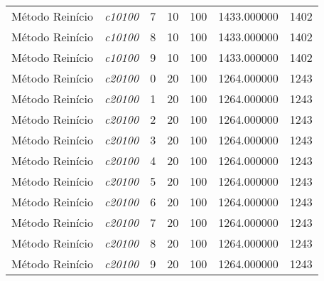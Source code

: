 {\begin{longtable}{cc|c|cc|cc}
			Método Reinício    & \textit{c10100}    & 7                               & 10               & 100              & 1433.000000                          & 1402 \\ 
			Método Reinício    & \textit{c10100}    & 8                               & 10               & 100              & 1433.000000                          & 1402 \\ 
			Método Reinício    & \textit{c10100}    & 9                               & 10               & 100              & 1433.000000                          & 1402 \\ \hline
			Método Reinício    & \textit{c20100}    & 0                               & 20               & 100              & 1264.000000                          & 1243 \\ 
			Método Reinício    & \textit{c20100}    & 1                               & 20               & 100              & 1264.000000                          & 1243 \\ 
			Método Reinício    & \textit{c20100}    & 2                               & 20               & 100              & 1264.000000                          & 1243 \\ 
			Método Reinício    & \textit{c20100}    & 3                               & 20               & 100              & 1264.000000                          & 1243 \\ 
			Método Reinício    & \textit{c20100}    & 4                               & 20               & 100              & 1264.000000                          & 1243 \\ 
			Método Reinício    & \textit{c20100}    & 5                               & 20               & 100              & 1264.000000                          & 1243 \\ 
			Método Reinício    & \textit{c20100}    & 6                               & 20               & 100              & 1264.000000                          & 1243 \\ 
			Método Reinício    & \textit{c20100}    & 7                               & 20               & 100              & 1264.000000                          & 1243 \\ 
			Método Reinício    & \textit{c20100}    & 8                               & 20               & 100              & 1264.000000                          & 1243 \\ 
			Método Reinício    & \textit{c20100}    & 9                               & 20               & 100              & 1264.000000                          & 1243 \\ \hline

\end{longtable}}
